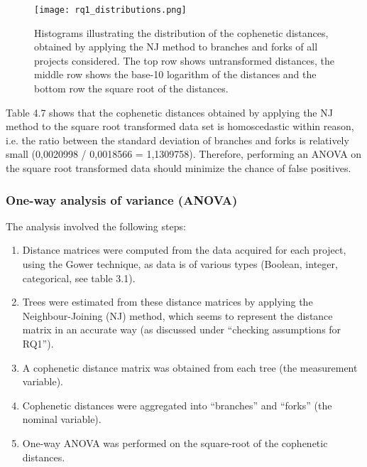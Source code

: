 \begin{figure}[H]
  \centering
  \texttt{[image: rq1\_distributions.png]}
  \caption{Histograms illustrating the distribution of the cophenetic distances, obtained by applying the NJ method to branches and forks of all projects considered. The top row shows untransformed distances, the middle row shows the base-10 logarithm of the distances and the bottom row the square root of the distances.}
  \label{fig:rq1_distributions}
\end{figure}


\noindent
Table 4.7 shows that the cophenetic distances obtained by applying the NJ method to the square root transformed data set is homoscedastic within reason, i.e. the ratio between the standard deviation of branches and forks is relatively small (0,0020998 /  0,0018566 = 1,1309758). Therefore, performing an ANOVA on the square root transformed data should minimize the chance of false positives.

\subsubsection{One-way analysis of variance (ANOVA)}
The analysis involved the following steps:

\begin{enumerate}
\item{Distance matrices were computed from the data acquired for each project, using the Gower technique, as data is of various types (Boolean, integer, categorical, see table 3.1).}

\item{Trees were estimated from these distance matrices by applying the Neighbour-Joining (NJ) method, which seems to represent the distance matrix in an accurate way (as discussed under “checking assumptions for RQ1”).}
  
\item{A cophenetic distance matrix was obtained from each tree (the measurement variable).}
  
\item{Cophenetic distances were aggregated into “branches” and “forks” (the nominal variable).}

\item{One-way ANOVA was performed on the square-root of the cophenetic distances.}
\end{enumerate}

